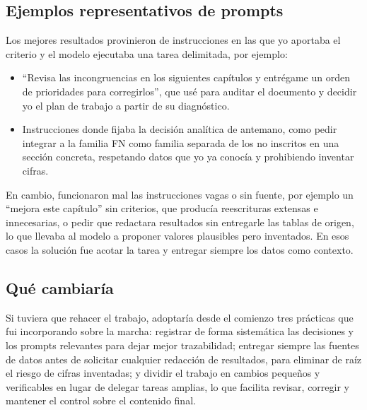 \subsection*{Ejemplos representativos de prompts}

Los mejores resultados provinieron de instrucciones en las que yo aportaba el
criterio y el modelo ejecutaba una tarea delimitada, por ejemplo:

\begin{itemize}
  \item ``Revisa las incongruencias en los siguientes capítulos y entrégame un
  orden de prioridades para corregirlos'', que usé para auditar el documento y
  decidir yo el plan de trabajo a partir de su diagnóstico.
  \item Instrucciones donde fijaba la decisión analítica de antemano, como pedir
  integrar a la familia FN como familia separada de los no inscritos en una
  sección concreta, respetando datos que yo ya conocía y prohibiendo inventar
  cifras.
\end{itemize}

En cambio, funcionaron mal las instrucciones vagas o sin fuente, por ejemplo un
``mejora este capítulo'' sin criterios, que producía reescrituras extensas e
innecesarias, o pedir que redactara resultados sin entregarle las tablas de
origen, lo que llevaba al modelo a proponer valores plausibles pero inventados.
En esos casos la solución fue acotar la tarea y entregar siempre los datos como
contexto.

\subsection*{Qué cambiaría}

Si tuviera que rehacer el trabajo, adoptaría desde el comienzo tres prácticas que
fui incorporando sobre la marcha: registrar de forma sistemática las decisiones y
los prompts relevantes para dejar mejor trazabilidad; entregar siempre las
fuentes de datos antes de solicitar cualquier redacción de resultados, para
eliminar de raíz el riesgo de cifras inventadas; y dividir el trabajo en cambios
pequeños y verificables en lugar de delegar tareas amplias, lo que facilita
revisar, corregir y mantener el control sobre el contenido final.
